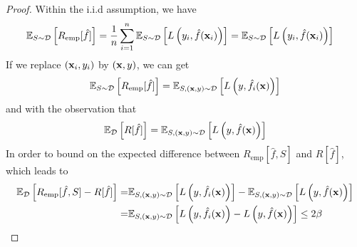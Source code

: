 \begin{proof}
	Within the i.i.d assumption, we have
	\begin{equation}
		\begin{aligned}
			\mathbb{E}_{S\sim\mathcal{D}}\left[R_{\text{emp}}[\hat{f}]\right] & =\frac{1}{n}\sum_{i=1}^{n}\mathbb{E}_{S\sim\mathcal{D}}\left[L\left(y_{i},\hat{f}(\mathbf{x}_{i})\right)\right]=\mathbb{E}_{S\sim\mathcal{D}}\left[L\left(y_{i},\hat{f}(\mathbf{x}_{i})\right)\right]
		\end{aligned}
	\end{equation}
	If we replace \((\mathbf{x}_{i},y_{i})\) by \((\mathbf{x},y)\), we can get
	\begin{equation}
		\mathbb{E}_{S\sim\mathcal{D}}\left[R_{\text{emp}}[\hat{f}]\right]=\mathbb{E}_{S,\left(\mathbf{x},y\right)\sim\mathcal{D}}\left[L\left(y,\hat{f}_{i}(\mathbf{x})\right)\right]
	\end{equation}
	and with the observation that
	\begin{equation}
		\mathbb{E}_{\mathcal{D}}\left[R[\hat{f}]\right]=\mathbb{E}_{S,\left(\mathbf{x},y\right)\sim\mathcal{D}}\left[L\left(y,\hat{f}(\mathbf{x})\right)\right]
	\end{equation}
	In order to bound on the expected difference between \(R_{\text{emp}}[\hat{f},S]\) and \(R[\hat{f}]\), which leads to
	\begin{equation}
		\begin{aligned}
			\mathbb{E}_{\mathcal{D}}\left[R_{\text{emp}}[\hat{f},S]-R[\hat{f}]\right]= & \mathbb{E}_{S,\left(\mathbf{x},y\right)\sim\mathcal{D}}\left[L\left(y,\hat{f}_{i}(\mathbf{x})\right)\right]-\mathbb{E}_{S,\left(\mathbf{x},y\right)\sim\mathcal{D}}\left[L\left(y,\hat{f}(\mathbf{x})\right)\right] \\
			=                                                                    & \mathbb{E}_{S,\left(\mathbf{x},y\right)\sim\mathcal{D}}\left[L\left(y,\hat{f}_{i}(\mathbf{x})\right)-L\left(y,\hat{f}(\mathbf{x})\right)\right]\leq 2\beta
		\end{aligned}
	\end{equation}


\end{proof}
